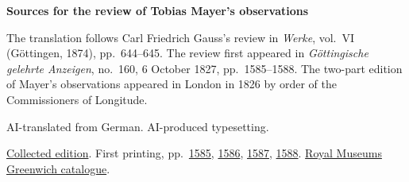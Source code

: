 \clearpage\thispagestyle{empty}
\begin{center}\Large\bfseries Sources for the review of Tobias Mayer’s observations\end{center}

The translation follows Carl Friedrich Gauss’s review in \emph{Werke}, vol.~VI (Göttingen, 1874), pp.~644--645. The review first appeared in \emph{Göttingische gelehrte Anzeigen}, no.~160, 6 October 1827, pp.~1585--1588. The two-part edition of Mayer’s observations appeared in London in 1826 by order of the Commissioners of Longitude.

AI-translated from German. AI-produced typesetting.

\href{https://gdz.sub.uni-goettingen.de/id/PPN236007467}{Collected edition}. First printing, pp.~\href{https://images.p.sub.uni-goettingen.de/iiif/image/gdz:PPN319721507_1827:00001591/full/1650,/0/default.jpg}{1585}, \href{https://images.p.sub.uni-goettingen.de/iiif/image/gdz:PPN319721507_1827:00001592/full/1650,/0/default.jpg}{1586}, \href{https://images.p.sub.uni-goettingen.de/iiif/image/gdz:PPN319721507_1827:00001593/full/1650,/0/default.jpg}{1587}, \href{https://images.p.sub.uni-goettingen.de/iiif/image/gdz:PPN319721507_1827:00001594/full/1650,/0/default.jpg}{1588}. \href{https://www.rmg.co.uk/collections/library/rmgl-119678}{Royal Museums Greenwich catalogue}.

\clearpage
